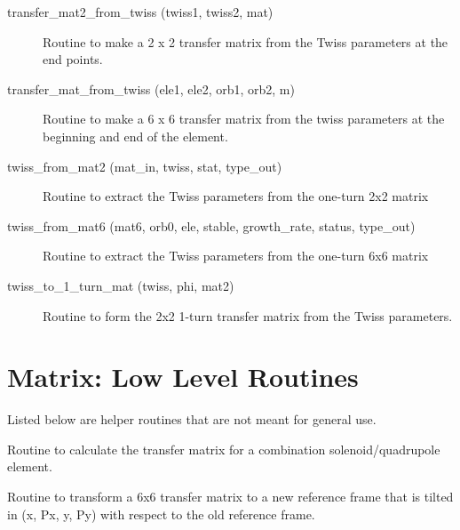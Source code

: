 \begin{description}
\label{r:transfer.mat2.from.twiss}
\item[transfer_mat2_from_twiss (twiss1, twiss2, mat)] \Newline
Routine to make a 2 x 2 transfer matrix from the Twiss parameters at the end points. 

\label{r:transfer.mat.from.twiss}
\item[transfer_mat_from_twiss (ele1, ele2, orb1, orb2, m)] \Newline 
Routine to make a 6 x 6 transfer matrix from the twiss parameters
at the beginning and end of the element.

\label{r:twiss.from.mat2}
\item[twiss_from_mat2 (mat_in, twiss, stat, type_out)] \Newline
Routine to extract the Twiss parameters from the one-turn 2x2 matrix 

\label{r:twiss.from.mat6}
\item[twiss_from_mat6 (mat6, orb0, ele, stable, growth_rate, status, type_out)] \Newline
Routine to extract the Twiss parameters from the one-turn 6x6 matrix 

\item[twiss_to_1_turn_mat (twiss, phi, mat2)] \Newline
Routine to form the 2x2 1-turn transfer matrix from the Twiss parameters. 

\end{description}

\section{Matrix: Low Level Routines}
\label{r:low.mat}  

Listed below are helper routines that are not meant for general use.

\begin{description}

\label{r:sol.quad.mat6.calc}
\item[sol_quad_mat6_calc (ks_in, k1_in, tilt, length, ele, orbit, mat6, make_matrix)] \Newline
Routine to calculate the transfer matrix for a combination solenoid/quadrupole element. 

\label{r:tilt.mat6}
\item[tilt_mat6 (mat6, tilt)] \Newline
Routine to transform a 6x6 transfer matrix to a new reference frame that is 
tilted in (x, Px, y, Py) with respect to the old reference frame. 

\end{description}

